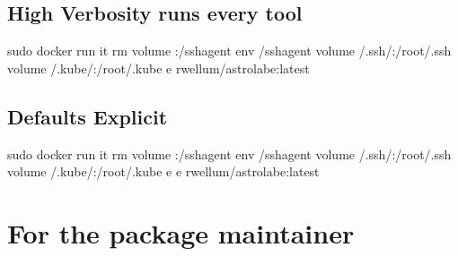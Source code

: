 \documentclass[letterpaper,10pt,english]{sphinxmanual}
\begin{document}
\subsection{High Verbosity \sphinxhyphen{} runs every tool}
\label{\detokenize{README:high-verbosity-runs-every-tool}}
\begin{sphinxVerbatim}[commandchars=\\\{\}]
sudo docker run 
\PYGZhy{}it \PYGZhy{}\PYGZhy{}rm 
\PYGZhy{}\PYGZhy{}volume :/ssh\PYGZhy{}agent \PYGZhy{}\PYGZhy{}env /ssh\PYGZhy{}agent 
\PYGZhy{}\PYGZhy{}volume /.ssh/:/root/.ssh 
\PYGZhy{}\PYGZhy{}volume /.kube/:/root/.kube 
\PYGZhy{}e  
rwellum/astrolabe:latest
\end{sphinxVerbatim}


\subsection{Defaults \sphinxhyphen{} Explicit}
\label{\detokenize{README:defaults-explicit}}
\begin{sphinxVerbatim}[commandchars=\\\{\}]
sudo docker run 
\PYGZhy{}it \PYGZhy{}\PYGZhy{}rm 
\PYGZhy{}\PYGZhy{}volume :/ssh\PYGZhy{}agent \PYGZhy{}\PYGZhy{}env /ssh\PYGZhy{}agent 
\PYGZhy{}\PYGZhy{}volume /.ssh/:/root/.ssh 
\PYGZhy{}\PYGZhy{}volume /.kube/:/root/.kube 
\PYGZhy{}e  \PYGZhy{}e  
rwellum/astrolabe:latest
\end{sphinxVerbatim}


\section{For the package maintainer}
\label{\detokenize{README:for-the-package-maintainer}}
\end{document}
